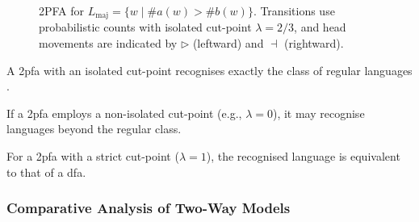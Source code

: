 \begin{figure}[ht]
    \centering  
    \caption{2PFA for \(L_{\text{maj}} = \{w \mid \#a(w) > \#b(w)\}\). Transitions use probabilistic counts with isolated cut-point \(\lambda = 2/3\), and head movements are indicated by \(\triangleright\) (leftward) and \(\dashv\) (rightward).}
    \label{fig:2pfa-example}
\end{figure}

\begin{theorem}
    \label{thm:2pfa-rabin}
    A \gls{2pfa} with an isolated cut-point recognises exactly the class of regular languages \cite{dwork1990time}.
\end{theorem}

\begin{proposition}
If a \gls{2pfa} employs a non-isolated cut-point (e.g., \(\lambda = 0\)), it may recognise languages beyond the regular class.
\end{proposition}

\begin{corollary}
For a \gls{2pfa} with a strict cut-point (\(\lambda = 1\)), the recognised language is equivalent to that of a \gls{dfa}.
\end{corollary}

\subsubsection{Comparative Analysis of Two-Way Models}
\label{subsubsec:two-way-comparison}

